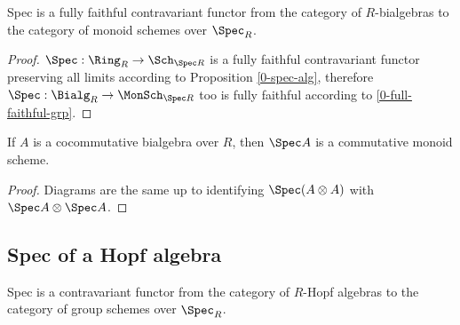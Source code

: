 \begin{proposition}
  \label{0-full-faithful-spec-bialg}
  \leanok

  Spec is a fully faithful contravariant functor from the category of $R$-bialgebras
  to the category of monoid schemes over $\Spec_R$.
\end{proposition}
\begin{proof}
  \leanok

  $\Spec : \Ring_R \to \Sch_{\Spec R}$ is a fully faithful contravariant functor
  preserving all limits according to Proposition \ref{0-spec-alg},
  therefore $\Spec : \Bialg_R \to \MonSch_{\Spec R}$ too is fully faithful
  according to \ref{0-full-faithful-grp}.
\end{proof}


\begin{proposition}
  \label{0-spec-cocomm-bialg}
  \leanok

  If $A$ is a cocommutative bialgebra over $R$, then $\Spec A$ is a commutative monoid scheme.
\end{proposition}
\begin{proof}
  \leanok

  Diagrams are the same up to identifying $\Spec (A \otimes A)$ with $\Spec A \otimes \Spec A$.
\end{proof}


\subsection{Spec of a Hopf algebra}


\begin{definition}
  \label{0-spec-hopf}
  \leanok

  Spec is a contravariant functor from the category of $R$-Hopf algebras to the category of group schemes over $\Spec_R$.
\end{definition}


